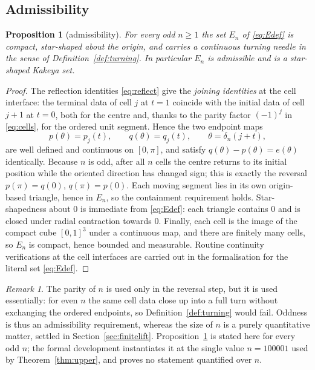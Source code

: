 \documentclass[11pt]{article}
\theoremstyle{plain}
\newtheorem{proposition}[theorem]{Proposition}
\theoremstyle{definition}
\theoremstyle{remark}
\newtheorem{remark}[theorem]{Remark}
\begin{document}
\subsection{Admissibility}

\begin{proposition}[admissibility]\label{prop:admissible}
For every odd $n\ge1$ the set $E_{n}$ of \eqref{eq:Edef} is compact,
star-shaped about the origin, and carries a continuous turning needle in the
sense of Definition~\ref{def:turning}. In particular $E_{n}$ is admissible and
is a star-shaped Kakeya set.
\end{proposition}

\begin{proof}
The reflection identities \eqref{eq:reflect} give the \emph{joining identities}
at the cell interface: the terminal data of cell $j$ at $t=1$ coincide with the
initial data of cell $j+1$ at $t=0$, both for the centre and, thanks to the
parity factor $(-1)^{j}$ in \eqref{eq:cells}, for the ordered unit segment.
Hence the two endpoint maps
\[
  p(\theta)=p_{j}(t),\qquad q(\theta)=q_{j}(t),
  \qquad \theta=\delta_{n}(j+t),
\]
are well defined and continuous on $[0,\pi]$, and satisfy
$q(\theta)-p(\theta)=e(\theta)$ identically. Because $n$ is odd, after all $n$
cells the centre returns to its initial position while the oriented direction has
changed sign; this is exactly the reversal $p(\pi)=q(0)$, $q(\pi)=p(0)$. Each
moving segment lies in its own origin-based triangle, hence in $E_{n}$, so the
containment requirement holds. Star-shapedness about $0$ is immediate from
\eqref{eq:Edef}: each triangle contains $0$ and is closed under radial
contraction towards $0$. Finally, each cell is the image of the compact cube
$[0,1]^{3}$ under a continuous map, and there are finitely many cells, so
$E_{n}$ is compact, hence bounded and measurable. Routine continuity
verifications at the cell interfaces are carried out in the formalisation for
the literal set \eqref{eq:Edef}.
\end{proof}

\begin{remark}\label{rem:parity}
The parity of $n$ is used only in the reversal step, but it is used essentially:
for even $n$ the same cell data close up into a full turn without exchanging the
ordered endpoints, so Definition~\ref{def:turning} would fail. Oddness is thus
an admissibility requirement, whereas the size of $n$ is a purely quantitative
matter, settled in Section~\ref{sec:finitelift}. Proposition~\ref{prop:admissible}
is stated here for every odd $n$; the formal development instantiates it at the
single value $n=100001$ used by Theorem~\ref{thm:upper}, and proves no statement
quantified over $n$.
\end{remark}
\end{document}
